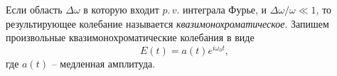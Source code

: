 



Если область $\Delta \omega$ в которую входит $p.\, v.$ интеграла Фурье, и $\Delta \omega / \omega \ll 1$, то результирующее колебание называется \textit{квазимонохроматическое}. Запишем произвольные квазимонохроматические колебания в виде
\begin{equation*}
    E(t) = a(t) e^{i \omega_0 t},
\end{equation*}
где $a(t)$ -- медленная амплитуда. 


